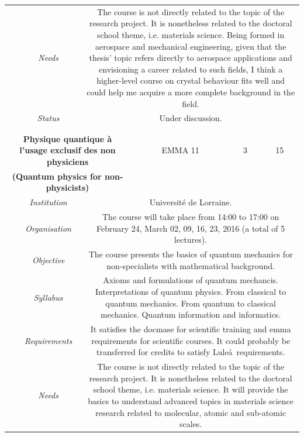 \documentclass[a4paper, twoside,12pt, abstract]{scrartcl} %
\begin{document}
\begin{center}
\begin{longtable}{cccccc}
    &\textit{Needs}&\multicolumn{4}{p{0.7\textwidth}}{The course is not directly related to the topic of the research project. It is nonetheless related to the doctoral school theme, i.e. materials science. Being formed in aerospace and mechanical engineering, given that the thesis' topic refers directly to aerospace applications and envisioning a career related to such fields, I think a higher-level course on crystal behaviour fits well and could help me acquire a more complete background in the field.}\\
    &\textit{Status}&\multicolumn{4}{p{0.7\textwidth}}{Under discussion.}\\
    &&&&&\\
    \midrule
    &&&&&\\
    \multicolumn{3}{p{0.5\textwidth}}{\textbf{Physique quantique à l'usage exclusif des non physiciens}}&EMMA 11&3&15\\
    \multicolumn{3}{p{0.5\textwidth}}{\textbf{(Quantum physics for non-physicists)}}&&&\\
    &\textit{Institution}&\multicolumn{4}{p{0.7\textwidth}}{Universit\'e de Lorraine.}\\
    &\textit{Organisation}&\multicolumn{4}{p{0.7\textwidth}}{The course will take place from 14:00 to 17:00 on February 24, March 02, 09, 16, 23, 2016 (a total of 5 lectures).}\\
    &\textit{Objective}&\multicolumn{4}{p{0.7\textwidth}}{The course presents the basics of quantum mechanics for non-specialists with mathematical background.}\\
    &\textit{Syllabus}&\multicolumn{4}{p{0.7\textwidth}}{Axioms and formulations of quantum mechancis. Interpretations of quantum physics. From classical to quantum mechanics. From quantum to classical mechanics. Quantum information and informatics.}\\
    &\textit{Requirements}&\multicolumn{4}{p{0.7\textwidth}}{It satisfies the \acrshort{docmase} for scientific training and \acrshort{emma} requirements for scientific courses. It could probably be transferred for credits to satisfy Lule\aa\ requirements.}\\
    &\textit{Needs}&\multicolumn{4}{p{0.7\textwidth}}{The course is not directly related to the topic of the research project. It is nonetheless related to the doctoral school theme, i.e. materials science. It will provide the basics to understand advanced topics in materials science research related to molecular, atomic and sub-atomic scales.}\\

\end{longtable}
\end{center}
\end{document}
